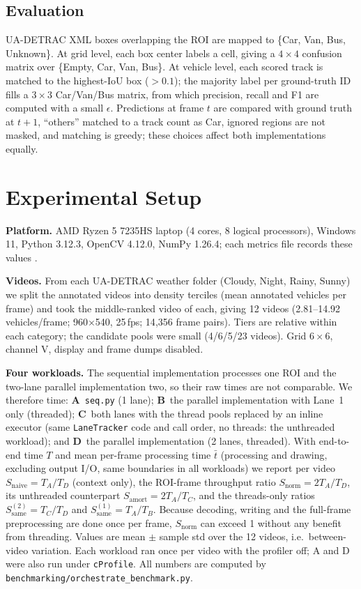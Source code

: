 \documentclass[conference]{IEEEtran}
\newcommand{\code}[1]{\texttt{#1}}
\begin{document}
\subsection{Evaluation}
\label{sec:eval}
UA-DETRAC XML boxes overlapping the ROI are mapped to \{Car, Van, Bus,
Unknown\}. At grid level, each box center labels a cell, giving a
$4\times4$ confusion matrix over \{Empty, Car, Van, Bus\}. At vehicle
level, each scored track is matched to the highest-IoU box ($>0.1$); the
majority label per ground-truth ID fills a $3\times3$ Car/Van/Bus matrix,
from which precision, recall and F1 are computed with a small
$\epsilon$. Predictions at frame $t$ are compared with ground truth at
$t{+}1$, ``others'' matched to a track count as Car, ignored regions are
not masked, and matching is greedy; these choices affect both implementations
equally.

\section{Experimental Setup}
\label{sec:experiments}
\textbf{Platform.} AMD Ryzen 5 7235HS laptop (4 cores, 8 logical
processors), Windows 11, Python 3.12.3, OpenCV 4.12.0, NumPy 1.26.4;
each metrics file records these values \cite{beyer2019}.

\textbf{Videos.} From each UA-DETRAC weather folder (Cloudy, Night,
Rainy, Sunny) we split the annotated videos into density terciles (mean
annotated vehicles per frame) and took the middle-ranked video of each,
giving 12 videos (2.81--14.92 vehicles/frame; 960$\times$540, 25\,fps;
14{,}356 frame pairs). Tiers are relative within each category; the
candidate pools were small (4/6/5/23 videos). Grid $6\times6$, channel V,
display and frame dumps disabled.

\textbf{Four workloads.} The sequential implementation processes one
ROI and the two-lane parallel implementation two, so their raw times are
not comparable. We therefore time: \textbf{A}~\code{seq.py} (1 lane);
\textbf{B}~the parallel implementation with Lane~1 only (threaded);
\textbf{C}~both lanes with the thread pools replaced by an inline executor
(same \code{LaneTracker} code and call order, no threads: the unthreaded
workload); and \textbf{D}~the parallel implementation (2 lanes, threaded). With end-to-end time $T$ and mean per-frame
processing time $\bar t$ (processing and drawing, excluding output I/O,
same boundaries in all workloads) we report per video
$S_{\text{naive}}=T_A/T_D$ (context only), the ROI-frame throughput ratio
$S_{\text{norm}}=2T_A/T_D$, its unthreaded counterpart
$S_{\text{amort}}=2T_A/T_C$, and the threads-only ratios
$S_{\text{same}}^{(2)}=T_C/T_D$ and $S_{\text{same}}^{(1)}=T_A/T_B$.
Because decoding, writing and the full-frame preprocessing are done once
per frame, $S_{\text{norm}}$ can exceed 1 without any benefit from
threading. Values are mean $\pm$ sample std over the 12 videos, i.e.\
between-video variation. Each workload ran once per video with the
profiler off; A and D were also run under \code{cProfile}. All numbers
are computed by \code{benchmarking/orchestrate\_benchmark.py}.
\end{document}
